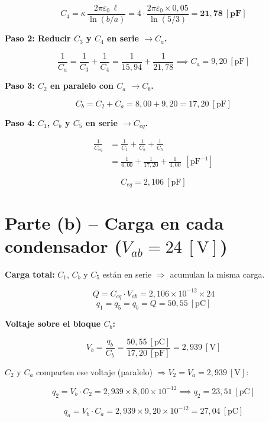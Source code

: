 \documentclass[12pt,letterpaper]{article}
\begin{document}
\[
    C_4 = \kappa\,\frac{2\pi\varepsilon_0\,\ell}{\ln(b/a)}
        = 4\cdot\frac{2\pi\varepsilon_0\times 0{,}05}{\ln(5/3)}
        = \mathbf{21{,}78\ [\text{pF}]}
\]

\noindent\textbf{Paso 2: Reducir $C_3$ y $C_4$ en serie $\rightarrow C_a$.}

\[
    \frac{1}{C_a} = \frac{1}{C_3} + \frac{1}{C_4}
                  = \frac{1}{15{,}94} + \frac{1}{21{,}78}
    \implies \boxed{C_a = 9{,}20\ [\text{pF}]}
\]

\noindent\textbf{Paso 3: $C_2$ en paralelo con $C_a$ $\rightarrow C_b$.}

\[
    C_b = C_2 + C_a = 8{,}00 + 9{,}20 = \boxed{17{,}20\ [\text{pF}]}
\]

\noindent\textbf{Paso 4: $C_1$, $C_b$ y $C_5$ en serie $\rightarrow C_{eq}$.}

\begin{align*}
    \frac{1}{C_{eq}} &= \frac{1}{C_1} + \frac{1}{C_b} + \frac{1}{C_5}\\[6pt]
                     &= \frac{1}{6{,}00} + \frac{1}{17{,}20} + \frac{1}{4{,}00}\ \ [\text{pF}^{-1}]
\end{align*}

\[
    \boxed{C_{eq} = 2{,}106\ [\text{pF}]}
\]

\section*{Parte (b) -- Carga en cada condensador ($V_{ab} = 24\ [\text{V}]$)}

\noindent\textbf{Carga total:} $C_1$, $C_b$ y $C_5$ est\'an en serie $\Rightarrow$ acumulan la misma carga.

\[
    Q = C_{eq}\cdot V_{ab} = 2{,}106\times10^{-12}\times 24
\]
\[
    \boxed{q_1 = q_5 = q_b = Q = 50{,}55\ [\text{pC}]}
\]

\noindent\textbf{Voltaje sobre el bloque $C_b$:}

\[
    V_b = \frac{q_b}{C_b} = \frac{50{,}55\ [\text{pC}]}{17{,}20\ [\text{pF}]} = 2{,}939\ [\text{V}]
\]

\noindent$C_2$ y $C_a$ comparten ese voltaje (paralelo) $\Rightarrow V_2 = V_a = 2{,}939\ [\text{V}]$:

\[
    q_2 = V_b\cdot C_2 = 2{,}939 \times 8{,}00\times10^{-12}
    \implies \boxed{q_2 = 23{,}51\ [\text{pC}]}
\]

\[
    q_a = V_b\cdot C_a = 2{,}939 \times 9{,}20\times10^{-12} = 27{,}04\ [\text{pC}]
\]
\end{document}

